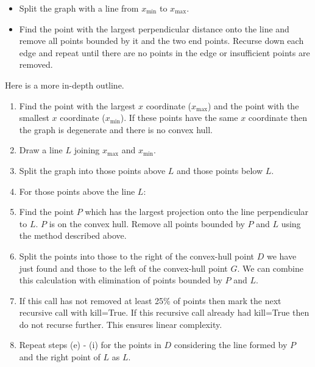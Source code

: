 \documentclass[10pt,\jkfside,a4paper]{article}
\begin{document}
\begin{enumerate}
\begin{itemize}

\item Split the graph with a line from $x_\text{min}$ to $x_\text{max}$.

\item Find the point with the largest perpendicular distance onto the line and 
remove all points bounded by it and the two end points. Recurse down each edge and 
repeat until there are no points in the edge or insufficient points are removed.

\end{itemize}

Here is a more in-depth outline.

\begin{enumerate}[label=(\alph*)]

\item Find the point with the largest $x$ coordinate ($x_\text{max}$) and the point with the smallest $x$ coordinate 
($x_\text{min}$). If these points have the same $x$ coordinate then the graph is degenerate and there is no 
convex hull.

\item Draw a line $L$ joining $x_\text{max}$ and $x_\text{min}$.

\item Split the graph into those points above $L$ and those points below $L$.

\item For those points above the line $L$:

\item Find the point $P$ which has the largest projection onto the line perpendicular to $L$. 
$P$ is on the convex hull. Remove all points bounded by $P$ and $L$ using the method described 
above.

\item Split the points into those to the right of the convex-hull point $D$ we have just found 
and those to the left of the convex-hull point $G$. We can combine this calculation with elimination 
of points bounded by $P$ and $L$.

\item If this call has not removed at least 25\% of points then mark the next recursive call with kill=True. 
If this recursive call already had kill=True then do not recurse further. This ensures linear complexity.

\item Repeat steps (e) - (i) for the points in $D$ considering the line formed by $P$ and 
the right point of $L$ as $L$.


\end{enumerate}
\end{enumerate}
\end{document}
